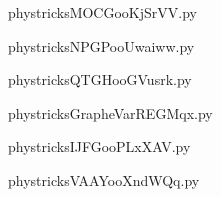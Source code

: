     \newcommand{\CaptionFigMOCGooKjSrVV}{<+Type your caption here+>}
    \begin{center}
        
    \end{center}
    phystricksMOCGooKjSrVV.py

    

    \clearpage
    


    \newcommand{\CaptionFigNPGPooUwaiww}{<+Type your caption here+>}
    \begin{center}
        
    \end{center}
    phystricksNPGPooUwaiww.py

    

    \clearpage
    


    \newcommand{\CaptionFigQTGHooGVusrk}{<+Type your caption here+>}
    \begin{center}
        
    \end{center}
    phystricksQTGHooGVusrk.py

    

    \clearpage
    


    \newcommand{\CaptionFigGrapheVarREGMqx}{<+Type your caption here+>}
    \begin{center}
        
    \end{center}
    phystricksGrapheVarREGMqx.py

    

    \clearpage
    


    \newcommand{\CaptionFigIJFGooPLxXAV}{<+Type your caption here+>}
    \begin{center}
        
    \end{center}
    phystricksIJFGooPLxXAV.py

    

    \clearpage
    


    \newcommand{\CaptionFigVAAYooXndWQq}{<+Type your caption here+>}
    \begin{center}
        
    \end{center}
    phystricksVAAYooXndWQq.py

